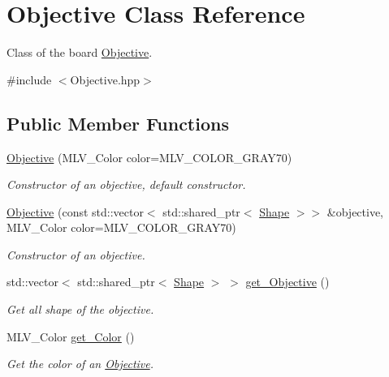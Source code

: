\hypertarget{classObjective}{}\section{Objective Class Reference}
\label{classObjective}


Class of the board \hyperlink{classObjective}{Objective}.  




{\ttfamily \#include $<$Objective.\+hpp$>$}

\subsection*{Public Member Functions}
\begin{DoxyCompactItemize}
\item 
\hyperlink{classObjective_ae515d38979a806a95f9476f4437311ab}{Objective} (M\+L\+V\+\_\+\+Color color=M\+L\+V\+\_\+\+C\+O\+L\+O\+R\+\_\+\+G\+R\+A\+Y70)
\begin{DoxyCompactList}\small\item\em Constructor of an objective, default constructor. \end{DoxyCompactList}\item 
\hyperlink{classObjective_a7b72b9e9f9174ec9ee98e3a0a28773f2}{Objective} (const std\+::vector$<$ std\+::shared\+\_\+ptr$<$ \hyperlink{classShape}{Shape} $>$$>$ \&objective, M\+L\+V\+\_\+\+Color color=M\+L\+V\+\_\+\+C\+O\+L\+O\+R\+\_\+\+G\+R\+A\+Y70)
\begin{DoxyCompactList}\small\item\em Constructor of an objective. \end{DoxyCompactList}\item 
std\+::vector$<$ std\+::shared\+\_\+ptr$<$ \hyperlink{classShape}{Shape} $>$ $>$ \hyperlink{classObjective_a9d379ffa32a62fbb5e5df62a88201baf}{get\+\_\+\+Objective} ()
\begin{DoxyCompactList}\small\item\em Get all shape of the objective. \end{DoxyCompactList}\item 
M\+L\+V\+\_\+\+Color \hyperlink{classObjective_ae20161454cf0dd248b8e17989044eb13}{get\+\_\+\+Color} ()
\begin{DoxyCompactList}\small\item\em Get the color of an \hyperlink{classObjective}{Objective}. \end{DoxyCompactList}\end{DoxyCompactItemize}
